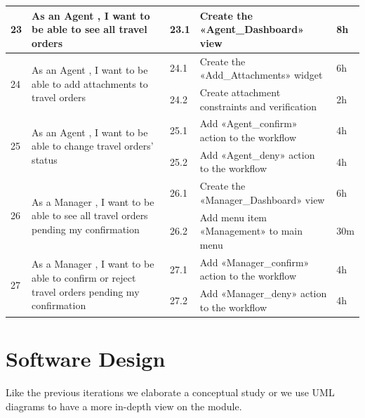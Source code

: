 \begin{center}
\begin{longtable}{|p{1cm}|p{}|p{}|p{}|p{}|}
\hline

23
&As an Agent , I want to be able to see all travel orders
&23.1
&Create the «Agent\_Dashboard» view
&8h\\\cline{3-5}

\hline

\multirow{2}{*}{24}
&\multirow{2}{=}{As an Agent , I want to be able to add attachments to travel orders}
&24.1
&Create the «Add\_Attachments» widget
&6h\\\cline{3-5}
&
&24.2
&Create attachment constraints and verification
&2h\\\cline{3-5}
\hline

\multirow{2}{*}{25}
&\multirow{2}{=}{As an Agent , I want to be able to change travel orders’ status}
&25.1
&Add «Agent\_confirm» action to the workflow
&4h\\\cline{3-5}
&
&25.2
&Add «Agent\_deny» action to the workflow
&4h\\\cline{3-5}
\hline

\multirow{2}{*}{26}
&\multirow{2}{=}{As a Manager , I want to be able to see all travel orders pending my confirmation}
&26.1
&Create the «Manager\_Dashboard» view
&6h\\\cline{3-5}
&
&26.2
&Add menu item «Management» to main menu
&30m\\\cline{3-5}
\hline

\multirow{2}{*}{27}
&\multirow{2}{=}{As a Manager , I want to be able to confirm or reject travel orders pending my confirmation}
&27.1
&Add «Manager\_confirm» action to the workflow
&4h\\\cline{3-5}
&
&27.2
&Add «Manager\_deny» action to the workflow
&4h\\\cline{3-5}
\hline


\end{longtable}
\end{center}


\section{Software Design}
Like the previous iterations we elaborate a conceptual study or we use UML diagrams to have a more in-depth view on the module.
    
